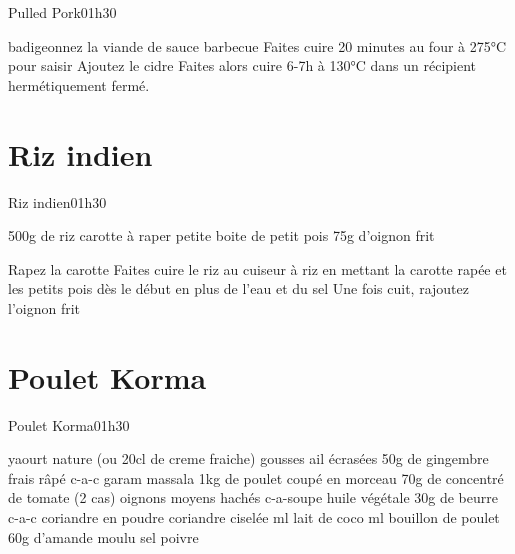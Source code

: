 {\begin{recette}{Pulled Pork}{0}{1h30}{}
\begin{preparation}
\etape badigeonnez la viande de sauce barbecue
\etape Faites cuire 20 minutes au four à 275°C pour saisir
\etape Ajoutez le cidre
\etape Faites alors cuire 6-7h à 130°C dans un récipient hermétiquement fermé.
\end{preparation}
\end{recette}

\section{Riz indien}
\begin{recette}{Riz indien}{0}{1h30}{}
\begin{ingredients}
\ingredient 500g de riz
 carotte à raper
\ingredient petite boite de petit pois
\ingredient 75g d'oignon frit
\end{ingredients}

\begin{preparation}
\etape Rapez la carotte
\etape Faites cuire le riz au cuiseur à riz en mettant la carotte rapée et les petits pois dès le début en plus de l'eau et du sel
\etape Une fois cuit, rajoutez l'oignon frit
\end{preparation}
\end{recette}

\section{Poulet Korma}
\begin{recette}{Poulet Korma}{0}{1h30}{}
\begin{ingredients}
 yaourt nature (ou 20cl de creme fraiche) %
 gousses ail écrasées
\ingredient 50g de gingembre frais râpé %
 c-a-c garam massala %
\ingredient 1kg de poulet coupé en morceau
\ingredient 70g de concentré de tomate (2 cas)
 oignons moyens hachés
 c-a-soupe huile végétale
\ingredient 30g de beurre
 c-a-c coriandre en poudre
\ingredient coriandre ciselée
 ml lait de coco
 ml bouillon de poulet
\ingredient 60g d'amande moulu
\ingredient sel
\ingredient poivre
\end{ingredients}


\end{recette}}
